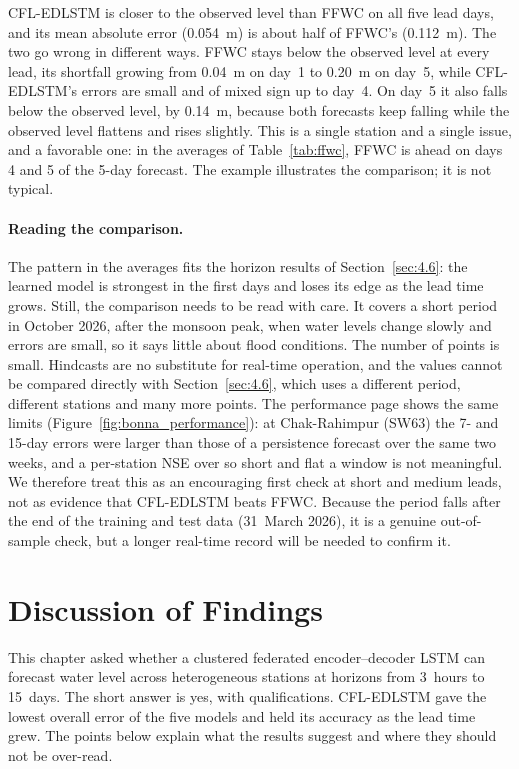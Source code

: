 CFL-EDLSTM is closer to the observed level than FFWC on all five lead days, and
its mean absolute error (0.054~m) is about half of FFWC's (0.112~m). The two go
wrong in different ways. FFWC stays below the observed level at every lead, its
shortfall growing from 0.04~m on day~1 to 0.20~m on day~5, while CFL-EDLSTM's
errors are small and of mixed sign up to day~4. On day~5 it also falls below the
observed level, by 0.14~m, because both forecasts keep falling while the
observed level flattens and rises slightly. This is a single station and a single
issue, and a favorable one: in the averages of Table~\ref{tab:ffwc}, FFWC is
ahead on days 4 and 5 of the 5-day forecast. The example illustrates the
comparison; it is not typical.

\paragraph{Reading the comparison.}
The pattern in the averages fits the horizon results of Section~\ref{sec:4.6}:
the learned model is strongest in the first days and loses its edge as the lead
time grows. Still, the comparison needs to be read with care. It covers a short
period in October 2026, after the monsoon peak, when water levels change slowly
and errors are small, so it says little about flood conditions. The number of
points is small. Hindcasts are no substitute for real-time operation, and the
values cannot be compared directly with Section~\ref{sec:4.6}, which uses a
different period, different stations and many more points. The performance page
shows the same limits (Figure~\ref{fig:bonna_performance}): at Chak-Rahimpur
(SW63) the 7- and 15-day errors were larger than those of a persistence forecast
over the same two weeks, and a per-station NSE over so short and flat a window is
not meaningful. We therefore treat this as an encouraging first check at short
and medium leads, not as evidence that CFL-EDLSTM beats FFWC. Because the period
falls after the end of the training and test data (31~March 2026), it is a
genuine out-of-sample check, but a longer real-time record will be needed to
confirm it.

\section{Discussion of Findings}
\label{sec:4.12}

This chapter asked whether a clustered federated encoder--decoder LSTM can
forecast water level across heterogeneous stations at horizons from 3~hours to
15~days. The short answer is yes, with qualifications. CFL-EDLSTM gave the lowest
overall error of the five models and held its accuracy as the lead time grew. The
points below explain what the results suggest and where they should not be
over-read.


